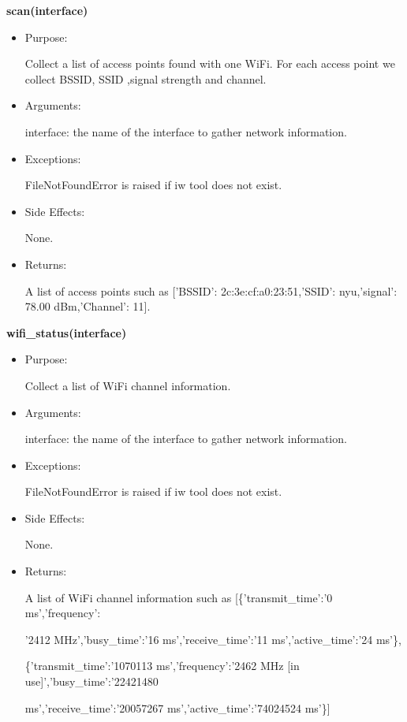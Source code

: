 \textbf{scan(interface)}
\begin{itemize}
\item Purpose:

Collect a list of access points found with one WiFi. For each access point we collect BSSID, SSID ,signal strength and channel.

\item Arguments:

interface: the name of the interface to gather network information.

\item Exceptions:

FileNotFoundError is raised if iw tool does not exist.

\item Side Effects:

None.

\item Returns:

A list of access points such as [{'BSSID': 2c:3e:cf:a0:23:51,'SSID': nyu,'signal': 78.00 dBm,'Channel': 11}].
\end{itemize}

\textbf{wifi\_status(interface)}
\begin{itemize}
\item Purpose:

Collect a list of WiFi channel information.

\item Arguments:

interface: the name of the interface to gather network information.

\item Exceptions:

FileNotFoundError is raised if iw tool does not exist.

\item Side Effects:

None.

\item Returns:

A list of WiFi channel information such as [\{'transmit\_time':'0 ms','frequency':

'2412 MHz','busy\_time':'16 ms','receive\_time':'11 ms','active\_time':'24 ms'\},

\{'transmit\_time':'1070113 ms','frequency':'2462 MHz [in use]','busy\_time':'22421480 

ms','receive\_time':'20057267 ms','active\_time':'74024524 ms'\}]
\end{itemize}

